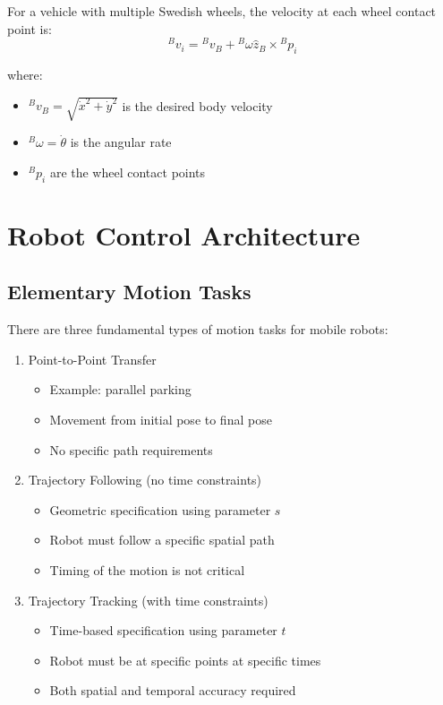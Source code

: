 \documentclass[openany]{book}
\theoremstyle{definition}
\theoremstyle{remark}
\begin{document}
For a vehicle with multiple Swedish wheels, the velocity at each wheel contact point is:
\begin{equation}
    {}^B v_i = {}^B v_B + {}^B\omega\hat{z}_B \times {}^B p_i
\end{equation}

where:
\begin{itemize}
    \item ${}^B v_B = \sqrt{\dot{x}^2 + \dot{y}^2}$ is the desired body velocity
    \item ${}^B\omega = \dot{\theta}$ is the angular rate
    \item ${}^B p_i$ are the wheel contact points
\end{itemize}


\chapter{Robot Control Architecture}

\section{Elementary Motion Tasks}

There are three fundamental types of motion tasks for mobile robots:

\begin{enumerate}
    \item Point-to-Point Transfer
    \begin{itemize}
        \item Example: parallel parking
        \item Movement from initial pose to final pose
        \item No specific path requirements
    \end{itemize}

    \item Trajectory Following (no time constraints)
    \begin{itemize}
        \item Geometric specification using parameter $s$
        \item Robot must follow a specific spatial path
        \item Timing of the motion is not critical
    \end{itemize}

    \item Trajectory Tracking (with time constraints)
    \begin{itemize}
        \item Time-based specification using parameter $t$
        \item Robot must be at specific points at specific times
        \item Both spatial and temporal accuracy required
    \end{itemize}
\end{enumerate}
\end{document}
